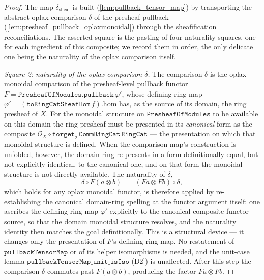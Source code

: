 \begin{proof}
  \leanok
  The map \(\delta_{\mathrm{sheaf}}\) is built (\cref{lem:pullback_tensor_map}) by
  transporting the abstract oplax comparison \(\delta\) of the presheaf pullback
  (\cref{lem:presheaf_pullback_oplaxmonoidal}) through the sheafification
  reconciliations. The asserted square is the pasting of four naturality squares, one for
  each ingredient of this composite; we record them in order, the only delicate one being the
  naturality of the oplax comparison itself.

  \emph{Square 2: naturality of the oplax comparison \(\delta\).} The comparison \(\delta\) is
  the oplax-monoidal comparison of the presheaf-level pullback functor
  \(F = \mathtt{PresheafOfModules.pullback}\,\varphi'\), whose defining ring map
  \(\varphi' = (\mathtt{toRingCatSheafHom}\,f).\mathrm{hom}\) has, as the source of its domain,
  the ring presheaf of \(X\). For the monoidal structure on \(\mathtt{PresheafOfModules}\) to
  be available on this domain the ring presheaf must be presented in its \emph{canonical}
  form as the composite
  \(\mathcal{O}_X \circ \mathtt{forget}_2\,\mathtt{CommRingCat}\,\mathtt{RingCat}\) --- the
  presentation on which that monoidal structure is defined. When the comparison map's
  construction is unfolded, however, the domain ring re-presents in a form definitionally
  equal, but not explicitly identical, to the canonical one, and on that form the
  monoidal structure is not directly available. The naturality of \(\delta\),
  \[
    \delta \circ F(a \otimes b) \;=\; (Fa \otimes Fb) \circ \delta,
  \]
  which holds for any oplax monoidal functor, is therefore applied by re-establishing the
  canonical domain-ring spelling at the functor argument itself: one ascribes the defining
  ring map \(\varphi'\) explicitly to the canonical composite-functor source, so that the
  domain monoidal structure resolves, and the naturality identity then matches the goal
  definitionally. This is a structural device --- it changes only the presentation of
  \(F\)'s defining ring map. No restatement of \(\mathtt{pullbackTensorMap}\) or of its helper
  isomorphisms is needed, and the unit-case lemma \(\mathtt{pullbackTensorMap\_unit\_isIso}\)
  (D2\(^\prime\)) is unaffected. After this step the comparison \(\delta\) commutes past
  \(F(a \otimes b)\), producing the factor \(Fa \otimes Fb\).


\end{proof}
